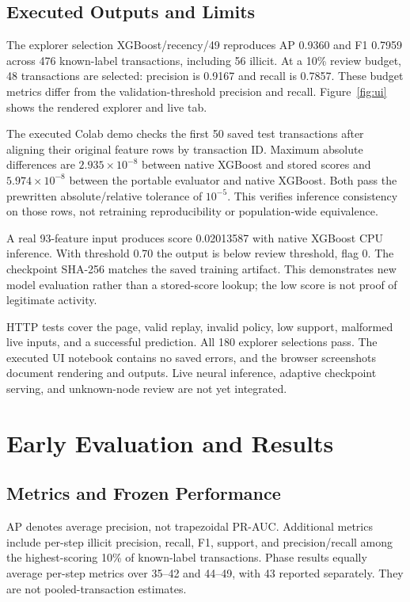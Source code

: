 \documentclass[10pt,twocolumn,letterpaper]{article}
\begin{document}
\subsection{Executed Outputs and Limits}
The explorer selection XGBoost/recency/49 reproduces AP 0.9360 and F1 0.7959 across 476 known-label transactions, including 56 illicit. At a 10\% review budget, 48 transactions are selected: precision is 0.9167 and recall is 0.7857. These budget metrics differ from the validation-threshold precision and recall. Figure~\ref{fig:ui} shows the rendered explorer and live tab.

The executed Colab demo checks the first 50 saved test transactions after aligning their original feature rows by transaction ID. Maximum absolute differences are $2.935\times10^{-8}$ between native XGBoost and stored scores and $5.974\times10^{-8}$ between the portable evaluator and native XGBoost. Both pass the prewritten absolute/relative tolerance of $10^{-5}$. This verifies inference consistency on those rows, not retraining reproducibility or population-wide equivalence.

A real 93-feature input produces score 0.02013587 with native XGBoost CPU inference. With threshold 0.70 the output is below review threshold, flag 0. The checkpoint SHA-256 matches the saved training artifact. This demonstrates new model evaluation rather than a stored-score lookup; the low score is not proof of legitimate activity.

HTTP tests cover the page, valid replay, invalid policy, low support, malformed live inputs, and a successful prediction. All 180 explorer selections pass. The executed UI notebook contains no saved errors, and the browser screenshots document rendering and outputs. Live neural inference, adaptive checkpoint serving, and unknown-node review are not yet integrated.

\section{Early Evaluation and Results}
\subsection{Metrics and Frozen Performance}
AP denotes average precision, not trapezoidal PR-AUC. Additional metrics include per-step illicit precision, recall, F1, support, and precision/recall among the highest-scoring 10\% of known-label transactions. Phase results equally average per-step metrics over 35--42 and 44--49, with 43 reported separately. They are not pooled-transaction estimates.
\end{document}
